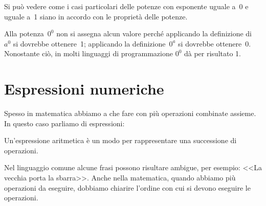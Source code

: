 \bigskip %

Si può vedere come i casi particolari delle potenze con esponente uguale a~0 
e uguale a~1 siano in accordo con le proprietà delle potenze.

\vspace{-1.5em}

\begin{osservazione}{}{} 
Alla potenza~\(0^0\) non si assegna alcun valore perché applicando la 
definizione di~\(a^0\) si dovrebbe ottenere~1;
applicando la definizione~\(0^a\) si dovrebbe ottenere~0. Nonostante ciò, in 
molti linguaggi di programmazione \(0^0\) dà per risultato 1.
\end{osservazione}


\section{Espressioni numeriche}
\label{sec:nat_espressioni}

Spesso in matematica abbiamo a che fare con più operazioni combinate 
assieme.
In questo caso parliamo di espressioni:

\begin{definizione}{}{}
 Un'espressione aritmetica è un modo per rappresentare una successione 
 di operazioni.
\end{definizione}

Nel linguaggio comune alcune frasi possono risultare ambigue, per esempio:
<<La vecchia porta la sbarra>>. 
Anche nella matematica, quando abbiamo più operazioni da eseguire, dobbiamo 
chiarire l'ordine con cui si devono eseguire le operazioni. 


